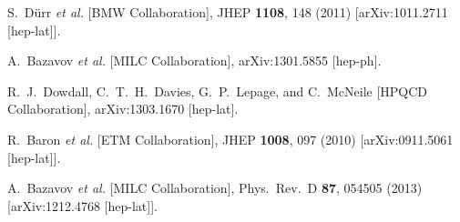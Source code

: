 \begin{thebibliography}{99}
  S.~D{\"u}rr {\it et al.} [BMW Collaboration],
  JHEP {\bf 1108}, 148 (2011)
  [arXiv:1011.2711 [hep-lat]].
  
  A.~Bazavov {\it et al.} [MILC Collaboration],
  arXiv:1301.5855 [hep-ph].
  
  R.~J.~Dowdall, C.~T.~H.~Davies, G.~P.~Lepage, and C.~McNeile [HPQCD Collaboration],
  arXiv:1303.1670 [hep-lat].
  
  R.~Baron {\it et al.}  [ETM Collaboration],
  JHEP {\bf 1008}, 097 (2010)
  [arXiv:0911.5061 [hep-lat]].
  
  A.~Bazavov {\it et al.}  [MILC Collaboration],
  Phys.\ Rev.\ D {\bf 87}, 054505 (2013)
  [arXiv:1212.4768 [hep-lat]].
  
\end{thebibliography}



